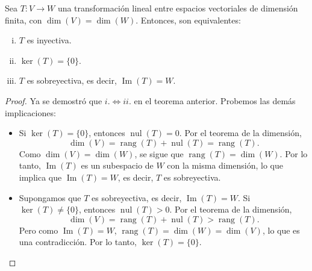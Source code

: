 \begin{theorem}
Sea $T: V \to W$ una transformación lineal entre espacios vectoriales de dimensión finita, con $\dim(V) = \dim(W)$. Entonces, son equivalentes:
\begin{enumerate}[i.]
    \item $T$ es inyectiva.
    \item $\ker(T) = \{0\}$.
    \item $T$ es sobreyectiva, es decir, $\operatorname{Im}(T) = W$.
\end{enumerate}
\begin{proof}
Ya se demostró que $i. \iff ii.$ en el teorema anterior. Probemos las demás implicaciones:

\begin{itemize}
    \item[$ii. \implies iii.$] Si $\ker(T) = \{0\}$, entonces $\operatorname{nul}(T) = 0$. Por el teorema de la dimensión,
    \[
    \dim(V) = \operatorname{rang}(T) + \operatorname{nul}(T) = \operatorname{rang}(T).
    \]
    Como $\dim(V) = \dim(W)$, se sigue que $\operatorname{rang}(T) = \dim(W)$. Por lo tanto, $\operatorname{Im}(T)$ es un subespacio de $W$ con la misma dimensión, lo que implica que $\operatorname{Im}(T) = W$, es decir, $T$ es sobreyectiva.

    \item[$iii. \implies ii.$] Supongamos que $T$ es sobreyectiva, es decir, $\operatorname{Im}(T) = W$. Si $\ker(T) \neq \{0\}$, entonces $\operatorname{nul}(T) > 0$. Por el teorema de la dimensión,
    \[
    \dim(V) = \operatorname{rang}(T) + \operatorname{nul}(T) > \operatorname{rang}(T).
    \]
    Pero como $\operatorname{Im}(T) = W$, $\operatorname{rang}(T) = \dim(W) = \dim(V)$, lo que es una contradicción. Por lo tanto, $\ker(T) = \{0\}$.
\end{itemize}
\end{proof}
\end{theorem}

